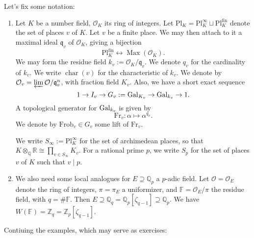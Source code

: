 \documentclass[reqno]{amsart} 
\numberwithin{theorem}{section}
\numberwithin{equation}{section}
\numberwithin{exercise}{section}
\begin{document}
\begin{example}
\begin{enumerate}[(a)]
    Let's fix some notation:
    \begin{enumerate}
    \item\label{enumerate:cq6r3f3t8d} Let $K$ be a number field, $\mathcal{O}_K$ its ring of integers.  Let $\mathrm{P l}_K = \mathrm{P l}_K^\infty \sqcup \mathrm{P l}_K^{\mathrm{fin}}$ denote the set of places $v$ of $K$.  Let $v$ be a finite place.  We may then attach to it a maximal ideal $\mathfrak{q}_v$ of $\mathcal{O}_K$, giving a bijection
      \begin{equation*}
        \mathrm{P l}_K^{\mathrm{fin}} \leftrightarrow \operatorname{Max}(\mathcal{O}_K).
      \end{equation*}
      We may form the residue field $k_v := \mathcal{O}_K / \mathfrak{q}_v$.  We denote $q_v$ for the cardinality of $k_v$.  We write $\operatorname{char}(v)$ for the characteristic of $k_v$.  We denote by $\mathcal{O}_v = \varprojlim \mathcal{O} / \mathfrak{q}_v^n$, with fraction field $K_v$.  Also, we have a short exact sequence
      \begin{equation*}
        1 \rightarrow I_v \rightarrow G_v := \operatorname{Gal}_{K_v} \rightarrow \operatorname{Gal}_{k_v} \rightarrow 1.
      \end{equation*}
      A topological generator for $\operatorname{Gal}_{k_v}$ is given by
      \begin{equation*}
        \mathrm{Fr}_v : \alpha \mapsto \alpha^{q_v}.
      \end{equation*}
      We denote by $\mathrm{Frob}_v \in G_v$ some lift of $\mathrm{Fr}_v$.

      We write $S_\infty := \mathrm{P l}_K^\infty$ for the set of archimedean places, so that $K \otimes_{\mathbb{Q}} \mathbb{R} \cong \prod_{v \in S_\infty} K_v$.  For a rational prime $p$, we write $S_p$ for the set of places $v$ of $K$ such that $v \mid p$.
    \item We also need some local analogues for $E \supseteq \mathbb{Q}_p$ a $p$-adic field.  Let $\mathcal{O} = \mathcal{O}_E$ denote the ring of integers, $\pi = \pi_E$ a uniformizer, and $\mathbb{F} = \mathcal{O}_E / \pi$ the residue field, with $q = \# \mathbb{F}$.  Then $E \supseteq \mathbb{Q}_q = \mathbb{Q}_p[\zeta_{q - 1}] \supseteq \mathbb{Q}_p$.  We have $W(\mathbb{F}) = \mathbb{Z}_q = \mathbb{Z}_p[\zeta_{q - 1}]$.
    \end{enumerate}

    Contiuing the examples, which may serve as exercises:
    

\end{enumerate}
\end{example}
\end{document}
